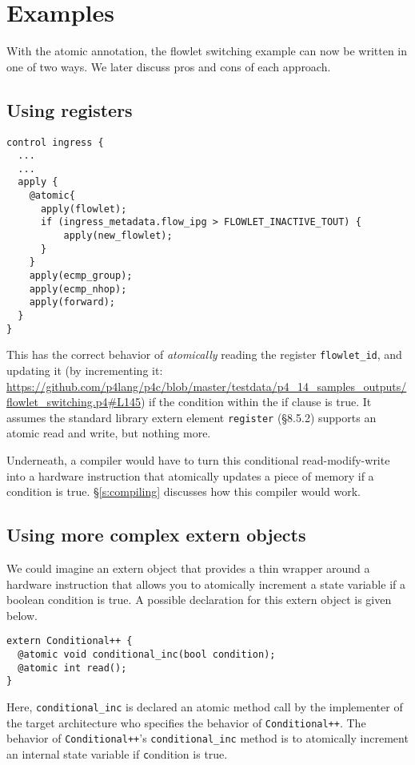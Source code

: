 \section{Examples}

With the atomic annotation, the flowlet switching example can now be written in
one of two ways. We later discuss pros and cons of each approach.

\subsection{Using registers}

\begin{verbatim}
control ingress {
  ...
  ...
  apply {
    @atomic{
      apply(flowlet);
      if (ingress_metadata.flow_ipg > FLOWLET_INACTIVE_TOUT) {
          apply(new_flowlet);
      }
    }
    apply(ecmp_group);
    apply(ecmp_nhop);
    apply(forward);
  }
}
\end{verbatim}

This has the correct behavior of \textit{atomically} reading the register
\texttt{flowlet\_id}, and updating it (by incrementing it:
\url{https://github.com/p4lang/p4c/blob/master/testdata/p4_14_samples_outputs/flowlet_switching.p4#L145})
if the condition within the if clause is true. It assumes the standard library
extern element \texttt{register} (\S8.5.2) supports an atomic read and write,
but nothing more.

Underneath, a compiler would have to turn this conditional read-modify-write
into a hardware instruction that atomically updates a piece of memory if a
condition is true. \S\ref{s:compiling} discusses how this compiler would work.

\subsection{Using more complex extern objects}

We could imagine an extern object that provides a thin wrapper around a
hardware instruction that allows you to atomically increment a state variable
if a boolean condition is true.  A possible declaration for this
extern object is given below.

\begin{verbatim}
extern Conditional++ {
  @atomic void conditional_inc(bool condition);
  @atomic int read();
}
\end{verbatim}

Here, \texttt{conditional\_inc} is declared an atomic method call by the
implementer of the target architecture who specifies the behavior of
\texttt{Conditional++}.  The behavior of \texttt{Conditional++}'s
\texttt{conditional\_inc} method is to atomically increment an internal state
variable if {\texttt condition} is true.

